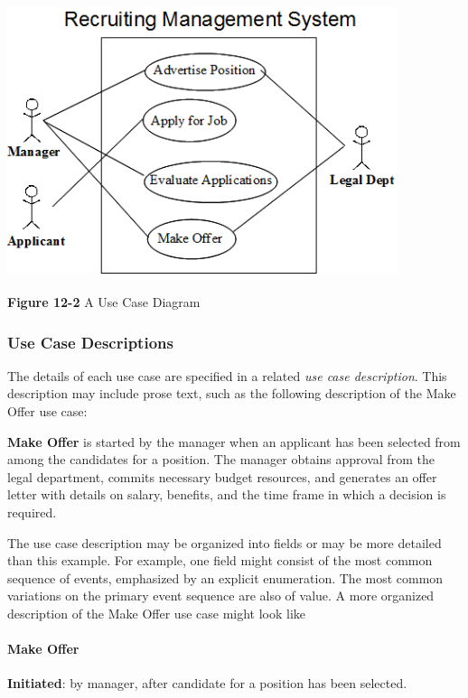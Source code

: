 \begin{center}
\includegraphics[width=4.5in,height=3.15in]{ub-img/usecase2.png}

{\sffamily\bfseries Figure 12-2}
{\sffamily A Use Case Diagram}
\end{center}

\subsubsection{Use Case Descriptions}

The details of each use case are specified in a related \textit{use case
description}. This description may include prose text, such as the
following description of the {\textquotedbl}Make Offer{\textquotedbl}
use case:

\textbf{Make Offer} is started by the manager when an applicant has been
selected from among the candidates for a position. The manager obtains
approval from the legal department, commits necessary budget resources,
and generates an offer letter with details on salary, benefits, and the
time frame in which a decision is required.

The use case description may be organized into fields or may be more
detailed than this example. For example, one field might consist of the
most common sequence of events, emphasized by an explicit enumeration.
The most common variations on the primary event sequence are also of
value. A more organized description of the Make Offer use case might
look like

\paragraph[Make Offer]{\bfseries Make Offer}
\textbf{Initiated}: by manager, after candidate for a position has been
selected.

